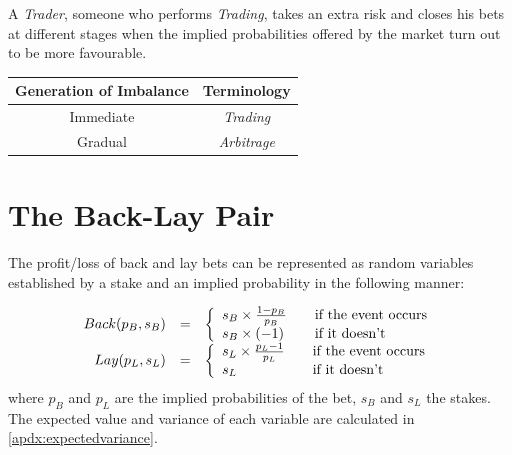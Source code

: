 \documentclass{article}
\begin{document}
A \emph{Trader}, someone who performs \emph{Trading}, takes an extra 
risk and closes his bets at different stages when the implied 
probabilities offered by the market turn out to be more favourable.

\begin{center}
    \begin{tabular}{ | c | c |}
        \hline
        Generation of Imbalance & Terminology \\ \hline\hline
        Immediate & \emph{Trading}\\ \hline
        Gradual & \emph{Arbitrage}\\
        \hline
    \end{tabular}
\end{center}

\section{The Back-Lay Pair}
The profit/loss of back and lay bets can be represented as random 
variables established by a stake and an implied probability in the 
following manner:

\[
\begin{array}{r c l}
    Back( p_{B}, s_{B} ) & = & \left\{
    \begin{array}{l l}
        s_{B} \times \frac{1-p_{B}}{p_{B}} & \quad
                                           \text{if the event occurs}\\
        s_{B} \times (-1)                  & \quad
                                                 \text{if it doesn't}\\
    \end{array} \right. \\
    
    Lay( p_{L}, s_{L} ) & = & \left\{
    \begin{array}{l l}
        s_{L} \times \frac{p_{L}-1}{p_{L}} & \quad
                                           \text{if the event occurs}\\
        s_{L}                              & \quad
                                                 \text{if it doesn't}\\
    \end{array} \right.
\end{array}
\]
where $p_{B}$ and $p_{L}$ are the implied probabilities of the bet, 
$s_{B}$ and $s_{L}$ the stakes. The expected value and variance of 
each variable are calculated in \ref{apdx:expectedvariance}.
\end{document}
